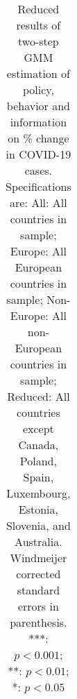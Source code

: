 \begin{table}[ht]
\begin{tabular}{lcccc}
   \bottomrule
\end{tabular}
\endgroup
\caption{Reduced results of two-step GMM estimation of policy, behavior and information on \% change in COVID-19 cases. Specifications are: All: All countries in sample; Europe: All European countries in sample; Non-Europe: All non-European countries in sample; Reduced: All countries except Canada, Poland, Spain, Luxembourg, Estonia, Slovenia, and Australia. \\ Windmeijer corrected standard errors in parenthesis. \\ ***: $p<0.001$; **: $p< 0.01$; *: $p< 0.05$} 
\label{tab_results:cases_reduced}
\end{table}
